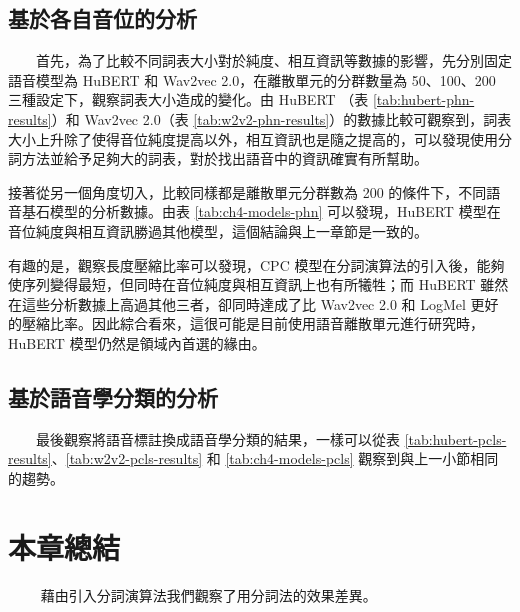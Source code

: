 \subsection{基於各自音位的分析}
　　首先，為了比較不同詞表大小對於純度、相互資訊等數據的影響，先分別固定語音模型為 HuBERT 和 Wav2vec 2.0，在離散單元的分群數量為 50、100、200 三種設定下，觀察詞表大小造成的變化。由 HuBERT （表 \ref{tab:hubert-phn-results}）和 Wav2vec 2.0（表 \ref{tab:w2v2-phn-results}）的數據比較可觀察到，詞表大小上升除了使得音位純度提高以外，相互資訊也是隨之提高的，可以發現使用分詞方法並給予足夠大的詞表，對於找出語音中的資訊確實有所幫助。    \par %
        接著從另一個角度切入，比較同樣都是離散單元分群數為 200 的條件下，不同語音基石模型的分析數據。由表 \ref{tab:ch4-models-phn} 可以發現，HuBERT 模型在音位純度與相互資訊勝過其他模型，這個結論與上一章節是一致的。 \par %
        有趣的是，觀察長度壓縮比率可以發現，CPC 模型在分詞演算法的引入後，能夠使序列變得最短，但同時在音位純度與相互資訊上也有所犧牲；而 HuBERT 雖然在這些分析數據上高過其他三者，卻同時達成了比 Wav2vec 2.0 和 LogMel 更好的壓縮比率。因此綜合看來，這很可能是目前使用語音離散單元進行研究時，HuBERT 模型仍然是領域內首選的緣由。

\subsection{基於語音學分類的分析}
　　最後觀察將語音標註換成語音學分類的結果，一樣可以從表 \ref{tab:hubert-pcls-results}、\ref{tab:w2v2-pcls-results} 和 \ref{tab:ch4-models-pcls} 觀察到與上一小節相同的趨勢。   

{
\section{本章總結}　 　藉由引入分詞演算法我們觀察了用分詞法的效果差異。
}  %
